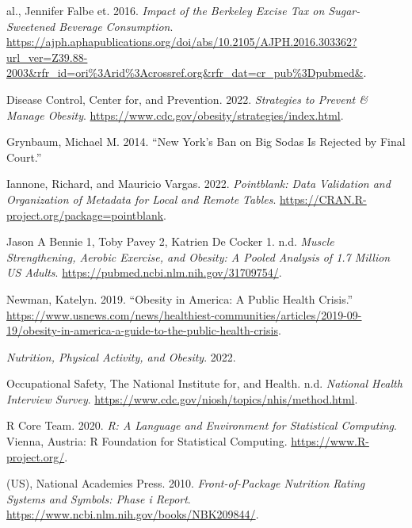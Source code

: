 \documentclass[
]{article}
\newlength{\cslhangindent}
\newlength{\cslentryspacingunit} %
\newenvironment{CSLReferences}[2] %
 {%
  \setlength{\parindent}{0pt}
  \ifodd #1
  \let\oldpar\par
  \def\par{\hangindent=\cslhangindent\oldpar}
  \fi
  \setlength{\parskip}{#2\cslentryspacingunit}
 }%
 {}
\begin{document}
\hypertarget{refs}{}
\begin{CSLReferences}{1}{0}
\leavevmode{}%
al., Jennifer Falbe et. 2016. \emph{Impact of the Berkeley Excise Tax on
Sugar-Sweetened Beverage Consumption}.
\url{https://ajph.aphapublications.org/doi/abs/10.2105/AJPH.2016.303362?url_ver=Z39.88-2003\&rfr_id=ori\%3Arid\%3Acrossref.org\&rfr_dat=cr_pub\%3Dpubmed\&}.

\leavevmode{}%
Disease Control, Center for, and Prevention. 2022. \emph{Strategies to
Prevent \& Manage Obesity}.
\url{https://www.cdc.gov/obesity/strategies/index.html}.

\leavevmode{}%
Grynbaum, Michael M. 2014. {``New York's Ban on Big Sodas Is Rejected by
Final Court.''}

\leavevmode{}%
Iannone, Richard, and Mauricio Vargas. 2022. \emph{Pointblank: Data
Validation and Organization of Metadata for Local and Remote Tables}.
\url{https://CRAN.R-project.org/package=pointblank}.

\leavevmode{}%
Jason A Bennie 1, Toby Pavey 2, Katrien De Cocker 1. n.d. \emph{Muscle
Strengthening, Aerobic Exercise, and Obesity: A Pooled Analysis of 1.7
Million US Adults}. \url{https://pubmed.ncbi.nlm.nih.gov/31709754/}.

\leavevmode{}%
Newman, Katelyn. 2019. {``Obesity in America: A Public Health Crisis.''}
\url{https://www.usnews.com/news/healthiest-communities/articles/2019-09-19/obesity-in-america-a-guide-to-the-public-health-crisis}.

\leavevmode{}%
\emph{Nutrition, Physical Activity, and Obesity}. 2022.

\leavevmode{}%
Occupational Safety, The National Institute for, and Health. n.d.
\emph{National Health Interview Survey}.
\url{https://www.cdc.gov/niosh/topics/nhis/method.html}.

\leavevmode{}%
R Core Team. 2020. \emph{R: A Language and Environment for Statistical
Computing}. Vienna, Austria: R Foundation for Statistical Computing.
\url{https://www.R-project.org/}.

\leavevmode{}%
(US), National Academies Press. 2010. \emph{Front-of-Package Nutrition
Rating Systems and Symbols: Phase i Report}.
\url{https://www.ncbi.nlm.nih.gov/books/NBK209844/}.


\end{CSLReferences}
\end{document}
